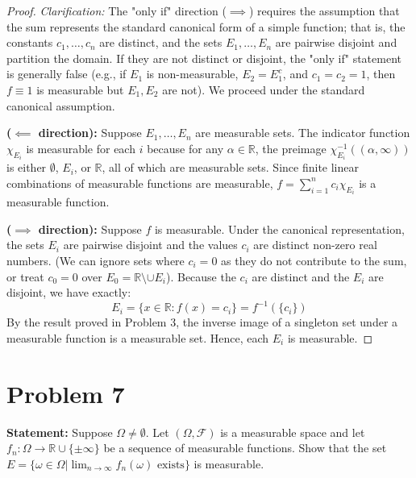 \documentclass[12pt]{article}
\begin{document}
\begin{proof}
\textit{Clarification:} The "only if" direction ($\implies$) requires the assumption that the sum represents the standard canonical form of a simple function; that is, the constants $c_1, \dots, c_n$ are distinct, and the sets $E_1, \dots, E_n$ are pairwise disjoint and partition the domain. If they are not distinct or disjoint, the "only if" statement is generally false (e.g., if $E_1$ is non-measurable, $E_2 = E_1^c$, and $c_1 = c_2 = 1$, then $f \equiv 1$ is measurable but $E_1, E_2$ are not). We proceed under the standard canonical assumption.

\textbf{($\impliedby$ direction):} 
Suppose $E_1, \dots, E_n$ are measurable sets. The indicator function $\chi_{E_i}$ is measurable for each $i$ because for any $\alpha \in \mathbb{R}$, the preimage $\chi_{E_i}^{-1}((\alpha, \infty))$ is either $\emptyset$, $E_i$, or $\mathbb{R}$, all of which are measurable sets. Since finite linear combinations of measurable functions are measurable, $f = \sum_{i=1}^n c_i \chi_{E_i}$ is a measurable function.

\textbf{($\implies$ direction):} 
Suppose $f$ is measurable. Under the canonical representation, the sets $E_i$ are pairwise disjoint and the values $c_i$ are distinct non-zero real numbers. (We can ignore sets where $c_i = 0$ as they do not contribute to the sum, or treat $c_0 = 0$ over $E_0 = \mathbb{R} \setminus \cup E_i$). 
Because the $c_i$ are distinct and the $E_i$ are disjoint, we have exactly:
\[
E_i = \{x \in \mathbb{R} : f(x) = c_i\} = f^{-1}(\{c_i\})
\]
By the result proved in Problem 3, the inverse image of a singleton set under a measurable function is a measurable set. Hence, each $E_i$ is measurable.
\end{proof}

\section*{Problem 7}
\textbf{Statement:} Suppose $\Omega\ne\emptyset$. Let $(\Omega, \mathcal{F})$ is a measurable space and let $f_{n}:\Omega\rightarrow \mathbb{R}\cup\{\pm\infty\}$ be a sequence of measurable functions. Show that the set $E=\{\omega\in\Omega|\lim_{n\rightarrow\infty}f_{n}(\omega) \text{ exists}\}$ is measurable.
\end{document}
